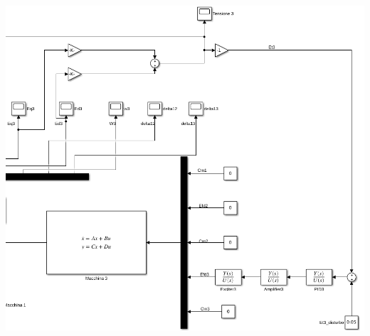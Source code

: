 \documentclass[Lau,noexaminfo]{sapthesis}
\begin{document}
	\includegraphics[scale=0.5,angle=90]{dettaglio_controllore_3}\newpage
\end{document}
